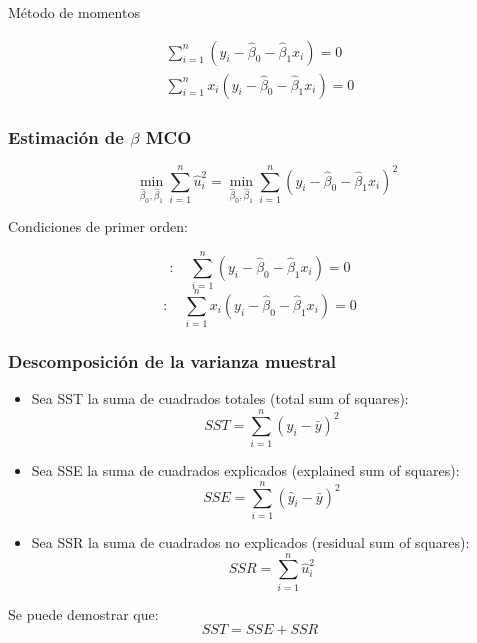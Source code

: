 \documentclass{beamer}
\begin{document}
\begin{frame}{Método de momentos}

\begin{eqnarray}
     \sum_{i=1}^{n} (y_i - \hat{\beta}_0 - \hat{\beta}_1 x_i) = 0  \\
 \sum_{i=1}^{n} x_i(y_i - \hat{\beta}_0 - \hat{\beta}_1 x_i) = 0 
\end{eqnarray}
    
\end{frame}



\begin{frame}
	\frametitle{Estimaci\'on de $\beta$ MCO} %
\begin{equation*}
\quad \min_{\hat{\beta}_0, \hat{\beta}_1} \sum_{i=1}^{n} \hat{u}_i^2 = \min_{\hat{\beta}_0, \hat{\beta}_1} \sum_{i=1}^{n} (y_i - \hat{\beta}_0 - \hat{\beta}_1 x_i)^2
\end{equation*}

Condiciones de primer orden:

\begin{equation*}
[\hat{\beta}_0] : \quad \sum_{i=1}^{n} (y_i - \hat{\beta}_0 - \hat{\beta}_1 x_i) = 0 
\end{equation*}
\begin{equation*}
[\hat{\beta}_1] : \quad \sum_{i=1}^{n} x_i(y_i - \hat{\beta}_0 - \hat{\beta}_1 x_i) = 0
\end{equation*}

\end{frame}


\begin{frame}
	\frametitle{Descomposición de la varianza muestral} %
	\begin{itemize}
		\item Sea SST la suma de cuadrados totales (total sum of squares):
		\[ SST = \sum_{i=1}^{n} (y_i - \bar{y})^2 \]
		
		\item Sea SSE la suma de cuadrados explicados (explained sum of squares):
		\[ SSE = \sum_{i=1}^{n} (\hat{y}_i - \bar{y})^2 \]
		
		\item Sea SSR la suma de cuadrados no explicados (residual sum of squares):
		\[ SSR = \sum_{i=1}^{n} \hat{u}_i^2 \]
	\end{itemize}
	Se puede demostrar que:
	\[ SST = SSE + SSR \]
\end{frame}	
\end{document}

